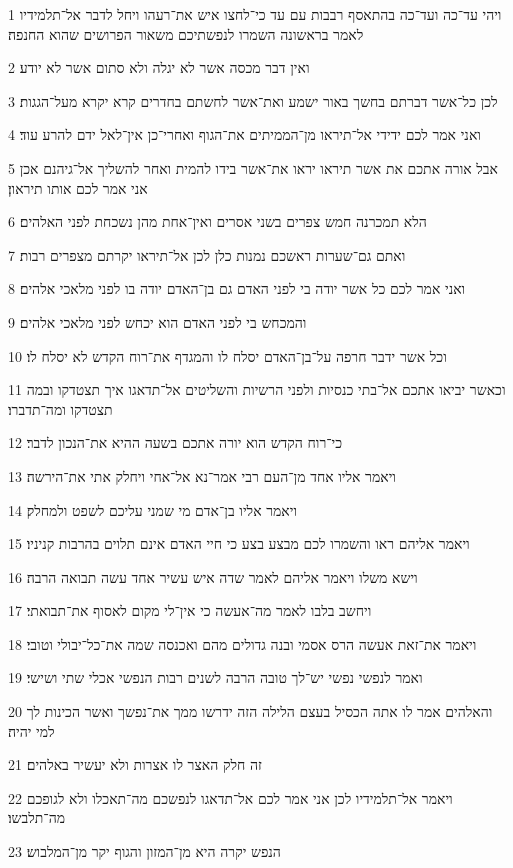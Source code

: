 \par 1 ויהי עד־כה ועד־כה בהתאסף רבבות עם עד כי־לחצו איש את־רעהו ויחל לדבר אל־תלמידיו לאמר בראשונה השמרו לנפשתיכם משאור הפרושים שהוא החנפה׃
\par 2 ואין דבר מכסה אשר לא יגלה ולא סתום אשר לא יודע׃
\par 3 לכן כל־אשר דברתם בחשך באור ישמע ואת־אשר לחשתם בחדרים קרא יקרא מעל־הגגות׃
\par 4 ואני אמר לכם ידידי אל־תיראו מן־הממיתים את־הגוף ואחרי־כן אין־לאל ידם להרע עוד׃
\par 5 אבל אורה אתכם את אשר תיראו יראו את־אשר בידו להמית ואחר להשליך אל־גיהנם אכן אני אמר לכם אותו תיראון׃
\par 6 הלא תמכרנה חמש צפרים בשני אסרים ואין־אחת מהן נשכחת לפני האלהים׃
\par 7 ואתם גם־שערות ראשכם נמנות כלן לכן אל־תיראו יקרתם מצפרים רבות׃
\par 8 ואני אמר לכם כל אשר יודה בי לפני האדם גם בן־האדם יודה בו לפני מלאכי אלהים׃
\par 9 והמכחש בי לפני האדם הוא יכחש לפני מלאכי אלהים׃
\par 10 וכל אשר ידבר חרפה על־בן־האדם יסלח לו והמגדף את־רוח הקדש לא יסלח לו׃
\par 11 וכאשר יביאו אתכם אל־בתי כנסיות ולפני הרשיות והשליטים אל־תדאגו איך תצטדקו ובמה תצטדקו ומה־תדברו׃
\par 12 כי־רוח הקדש הוא יורה אתכם בשעה ההיא את־הנכון לדבר׃
\par 13 ויאמר אליו אחד מן־העם רבי אמר־נא אל־אחי ויחלק אתי את־הירשה׃
\par 14 ויאמר אליו בן־אדם מי שמני עליכם לשפט ולמחלק׃
\par 15 ויאמר אליהם ראו והשמרו לכם מבצע בצע כי חיי האדם אינם תלוים בהרבות קניניו׃
\par 16 וישא משלו ויאמר אליהם לאמר שדה איש עשיר אחד עשה תבואה הרבה׃
\par 17 ויחשב בלבו לאמר מה־אעשה כי אין־לי מקום לאסוף את־תבואתי׃
\par 18 ויאמר את־זאת אעשה הרס אסמי ובנה גדולים מהם ואכנסה שמה את־כל־יבולי וטובי׃
\par 19 ואמר לנפשי נפשי יש־לך טובה הרבה לשנים רבות הנפשי אכלי שתי ושישי׃
\par 20 והאלהים אמר לו אתה הכסיל בעצם הלילה הזה ידרשו ממך את־נפשך ואשר הכינות לך למי יהיה׃
\par 21 זה חלק האצר לו אצרות ולא יעשיר באלהים׃
\par 22 ויאמר אל־תלמידיו לכן אני אמר לכם אל־תדאגו לנפשכם מה־תאכלו ולא לגופכם מה־תלבשו׃
\par 23 הנפש יקרה היא מן־המזון והגוף יקר מן־המלבוש׃
